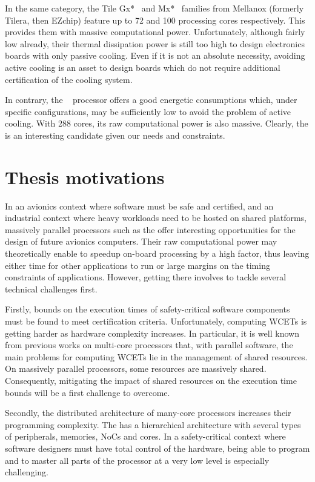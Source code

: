 \documentclass[main.tex]{subfiles}
\begin{document}
In the same category, the Tile Gx*~\cite{TileGx} and Mx*~\cite{TileMx} families from Mellanox (formerly Tilera, then EZchip) feature up to 72 and 100 processing cores respectively. This provides them with massive computational power. Unfortunately, although fairly low already, their thermal dissipation power is still too high to design electronics boards with only passive cooling. Even if it is not an absolute necessity, avoiding active cooling is an asset to design boards which do not require additional certification of the cooling system.

In contrary, the \mppalong~\cite{kalray_mppa} processor offers a good energetic consumptions which, under specific configurations, may be sufficiently low to avoid the problem of active cooling. With 288 cores, its raw computational power is also massive. Clearly, the \mppalong is an interesting candidate given our needs and constraints.


\section{Thesis motivations}
In an avionics context where software must be safe and certified, and an industrial context where heavy workloads need to be hosted on shared platforms, massively parallel processors such as the \mppalong offer interesting opportunities for the design of future avionics computers. Their raw computational power may theoretically enable to speedup on-board processing by a high factor, thus leaving either time for other applications to run or large margins on the timing constraints of applications. However, getting there involves to tackle several technical challenges first.


Firstly, bounds on the execution times of safety-critical software components must be found to meet certification criteria. Unfortunately, computing WCETs is getting harder as hardware complexity increases. In particular, it is well known from previous works on multi-core processors that, with parallel software, the main problems for computing WCETs lie in the management of shared resources. On massively parallel processors, some resources are massively shared. Consequently, mitigating the impact of shared resources on the execution time bounds will be a first challenge to overcome.

Secondly, the distributed architecture of many-core processors increases their programming complexity. The \mppalong has a hierarchical architecture with several types of peripherals, memories, NoCs and cores. In a safety-critical context where software designers must have total control of the hardware, being able to program and to master all parts of the processor at a very low level is especially challenging.
\end{document}
